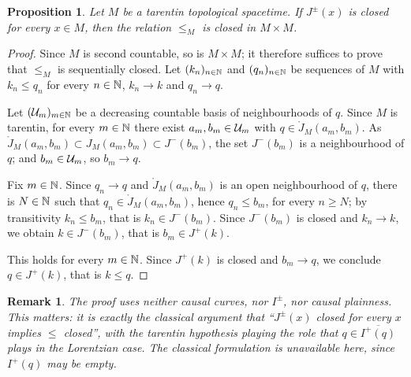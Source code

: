 \documentclass[a4paper,twoside]{article}
\newtheorem{prop}[lem]{Proposition}
\newtheorem{rem}[lem]{Remark}
\begin{document}
\begin{prop}\label{prop:relation_fermee}
Let $M$ be a tarentin topological spacetime. If $J^\pm(x)$ is closed for every $x\in M$, then the
relation $\leq_M$ is closed in $M\times M$.
\end{prop}
\begin{proof}
Since $M$ is second countable, so is $M\times M$; it therefore suffices to prove that $\leq_M$ is
sequentially closed. Let $(k_n)_{n\in \mathbb{N}}$ and $(q_n)_{n\in \mathbb{N}}$ be sequences of $M$ with
$k_n\leq q_n$ for every $n\in \mathbb{N}$, $k_n\rightarrow k$ and $q_n\rightarrow q$.

Let $(\mathcal{U}_m)_{m\in \mathbb{N}}$ be a decreasing countable basis of neighbourhoods of $q$. Since $M$ is
tarentin, for every $m\in \mathbb{N}$ there exist $a_m,b_m\in \mathcal{U}_m$ with $q\in \ring J_M(a_m,b_m)$. As
$\ring J_M(a_m,b_m)\subset J_M(a_m,b_m)\subset J^-(b_m)$, the set $J^-(b_m)$ is a neighbourhood of
$q$; and $b_m\in \mathcal{U}_m$, so $b_m\rightarrow q$.

Fix $m\in \mathbb{N}$. Since $q_n\rightarrow q$ and $\ring J_M(a_m,b_m)$ is an open neighbourhood of $q$,
there is $N\in \mathbb{N}$ such that $q_n\in \ring J_M(a_m,b_m)$, hence $q_n\leq b_m$, for every $n\geq N$;
by transitivity $k_n\leq b_m$, that is $k_n\in J^-(b_m)$. Since $J^-(b_m)$ is closed and
$k_n\rightarrow k$, we obtain $k\in J^-(b_m)$, that is $b_m\in J^+(k)$.

This holds for every $m\in \mathbb{N}$. Since $J^+(k)$ is closed and $b_m\rightarrow q$, we conclude
$q\in J^+(k)$, that is $k\leq q$.
\end{proof}
\begin{rem}\label{rem:proof_uses_neither_causal}
The proof uses neither causal curves, nor $I^\pm$, nor causal plainness. This matters: it is exactly
the classical argument that ``$J^\pm(x)$ closed for every $x$ implies $\leq$ closed'', with the
tarentin hypothesis playing the role that $q\in \overline{I^+(q)}$ plays in the Lorentzian case.
The classical formulation is unavailable here, since $I^+(q)$ may be empty.
\end{rem}
\end{document}
